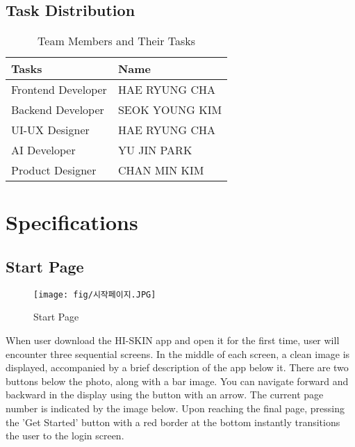 \documentclass[conference]{IEEEtran}
\begin{document}
\subsection{Task Distribution}

\begin{table}[h]
\centering
\caption{Team Members and Their Tasks}
\renewcommand{\arraystretch}{1.5}
\begin{tabular}{| p{3cm}|p{3cm}|}

\hline
Tasks & Name \\

\hline
Frontend Developer & HAE RYUNG CHA\\

\hline
Backend Developer & SEOK YOUNG KIM\\

\hline
UI-UX Designer & HAE RYUNG CHA\\

\hline
AI Developer & YU JIN PARK\\

\hline
Product Designer & CHAN MIN KIM\\ 

\hline
\end{tabular}
\end{table}

\section{Specifications}

\subsection{Start Page}
    \begin{figure}[h]
    \centering
    \texttt{[image: fig/시작페이지.JPG]}
    \label{fig:Start Page}
    \caption{Start Page} 
    \end{figure}
When user download the HI-SKIN app and open it for the first time, user will encounter three sequential screens. In the middle of each screen, a clean image is displayed, accompanied by a brief description of the app below it. There are two buttons below the photo, along with a bar image. You can navigate forward and backward in the display using the button with an arrow. The current page number is indicated by the image below. Upon reaching the final page, pressing the 'Get Started' button with a red border at the bottom instantly transitions the user to the login screen.\\ \\ \\ \\ \\ \\ \\ 
\end{document}

